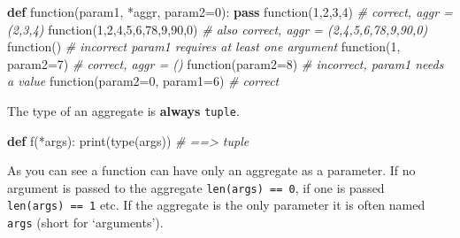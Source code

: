 \documentclass[ignorenonframetext,]{beamer}
\newenvironment{Shaded}{}{}
\newcommand{\KeywordTok}[1]{\textcolor[rgb]{0.00,0.44,0.13}{\textbf{{#1}}}}
\newcommand{\DecValTok}[1]{\textcolor[rgb]{0.25,0.63,0.44}{{#1}}}
\newcommand{\CommentTok}[1]{\textcolor[rgb]{0.38,0.63,0.69}{\textit{{#1}}}}
\newcommand{\ControlFlowTok}[1]{\textcolor[rgb]{0.00,0.44,0.13}{\textbf{{#1}}}}
\newcommand{\OperatorTok}[1]{\textcolor[rgb]{0.40,0.40,0.40}{{#1}}}
\newcommand{\BuiltInTok}[1]{{#1}}
\newcommand{\NormalTok}[1]{{#1}}
\begin{document}
\begin{frame}[fragile]

\begin{Shaded}
\begin{Highlighting}[]
\KeywordTok{def} \NormalTok{function(param1, }\OperatorTok{*}\NormalTok{aggr, param2}\OperatorTok{=}\DecValTok{0}\NormalTok{):}
    \ControlFlowTok{pass}
\NormalTok{function(}\DecValTok{1}\NormalTok{,}\DecValTok{2}\NormalTok{,}\DecValTok{3}\NormalTok{,}\DecValTok{4}\NormalTok{)  }\CommentTok{# correct, aggr = (2,3,4)}
\NormalTok{function(}\DecValTok{1}\NormalTok{,}\DecValTok{2}\NormalTok{,}\DecValTok{4}\NormalTok{,}\DecValTok{5}\NormalTok{,}\DecValTok{6}\NormalTok{,}\DecValTok{78}\NormalTok{,}\DecValTok{9}\NormalTok{,}\DecValTok{90}\NormalTok{,}\DecValTok{0}\NormalTok{)  }
\CommentTok{# also correct, aggr = (2,4,5,6,78,9,90,0)}
\NormalTok{function()  }\CommentTok{# incorrect param1 requires at least one argument}
\NormalTok{function(}\DecValTok{1}\NormalTok{, param2}\OperatorTok{=}\DecValTok{7}\NormalTok{)  }\CommentTok{# correct, aggr = ()}
\NormalTok{function(param2}\OperatorTok{=}\DecValTok{8}\NormalTok{)  }\CommentTok{# incorrect, param1 needs a value}
\NormalTok{function(param2}\OperatorTok{=}\DecValTok{0}\NormalTok{, param1}\OperatorTok{=}\DecValTok{6}\NormalTok{)  }\CommentTok{# correct}
\end{Highlighting}
\end{Shaded}

The type of an aggregate is \textbf{always} \texttt{tuple}.

\end{frame}

\begin{frame}[fragile]

\begin{Shaded}
\begin{Highlighting}[]
\KeywordTok{def} \NormalTok{f(}\OperatorTok{*}\NormalTok{args):}
    \BuiltInTok{print}\NormalTok{(}\BuiltInTok{type}\NormalTok{(args)) }\CommentTok{# ==> tuple}
\end{Highlighting}
\end{Shaded}

As you can see a function can have only an aggregate as a parameter. If
no argument is passed to the aggregate \texttt{len(args)\ ==\ 0}, if one
is passed \texttt{len(args)\ ==\ 1} etc. If the aggregate is the only
parameter it is often named \texttt{args} (short for `arguments').

\end{frame}
\end{document}
